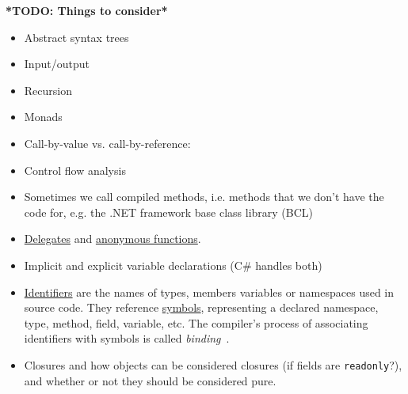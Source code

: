 \documentclass[a4paper,12pt]{article}
\begin{document}

\textbf{*TODO: Things to consider*}

\begin{itemize}
  \item Abstract syntax trees
  \item Input/output
  \item Recursion
  \item Monads
  \item Call-by-value vs. call-by-reference: %
  \item Control flow analysis
  \item Sometimes we call compiled methods, i.e. methods that we don't have the code for, e.g. the .NET framework base class library (BCL)
  \item \href{https://docs.microsoft.com/en-us/dotnet/csharp/programming-guide/delegates/}{Delegates} and \href{https://docs.microsoft.com/en-us/dotnet/csharp/programming-guide/statements-expressions-operators/anonymous-functions}{anonymous functions}.
  \item Implicit and explicit variable declarations (C\# handles both)
  \item \href{https://docs.microsoft.com/en-us/dotnet/csharp/programming-guide/inside-a-program/identifier-names}{Identifiers} are the names of types, members variables or namespaces used in source code. They reference \href{https://docs.microsoft.com/en-us/dotnet/csharp/roslyn-sdk/work-with-semantics#symbols}{symbols}, representing a declared namespace, type, method, field, variable, etc. The compiler's process of associating identifiers with symbols is called \textit{binding}~\cite{microsoft-semantic-analysis}. %
  \item Closures and how objects can be considered closures (if fields are \texttt{readonly}?), and whether or not they should be considered pure.
\end{itemize}
\end{document}
